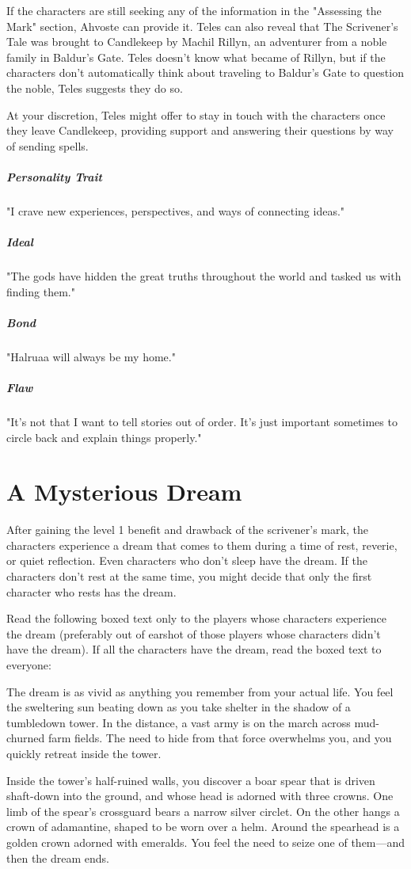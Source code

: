 \documentclass[10pt,a4paper,twoside,bg=print,twocolumn,openany,nodeprecatedcode]{dndbook}
\begin{document}
If the characters are still seeking any of the information in the "Assessing the Mark" section, Ahvoste can provide it. Teles can also reveal that The Scrivener's Tale was brought to Candlekeep by Machil Rillyn, an adventurer from a noble family in Baldur's Gate. Teles doesn't know what became of Rillyn, but if the characters don't automatically think about traveling to Baldur's Gate to question the noble, Teles suggests they do so.

At your discretion, Teles might offer to stay in touch with the characters once they leave Candlekeep, providing support and answering their questions by way of sending spells.

\subparagraph{Personality Trait}
"I crave new experiences, perspectives, and ways of connecting ideas."

\subparagraph{Ideal}
"The gods have hidden the great truths throughout the world and tasked us with finding them."

\subparagraph{Bond}
"Halruaa will always be my home."

\subparagraph{Flaw}
"It's not that I want to tell stories out of order. It's just important sometimes to circle back and explain things properly."

\section{A Mysterious Dream}
After gaining the level 1 benefit and drawback of the scrivener's mark, the characters experience a dream that comes to them during a time of rest, reverie, or quiet reflection. Even characters who don't sleep have the dream. If the characters don't rest at the same time, you might decide that only the first character who rests has the dream.

Read the following boxed text only to the players whose characters experience the dream (preferably out of earshot of those players whose characters didn't have the dream). If all the characters have the dream, read the boxed text to everyone:

\begin{DndReadAloud}{}
The dream is as vivid as anything you remember from your actual life. You feel the sweltering sun beating down as you take shelter in the shadow of a tumbledown tower. In the distance, a vast army is on the march across mud-churned farm fields. The need to hide from that force overwhelms you, and you quickly retreat inside the tower.

Inside the tower's half-ruined walls, you discover a boar spear that is driven shaft-down into the ground, and whose head is adorned with three crowns. One limb of the spear's crossguard bears a narrow silver circlet. On the other hangs a crown of adamantine, shaped to be worn over a helm. Around the spearhead is a golden crown adorned with emeralds. You feel the need to seize one of them—and then the dream ends.

\end{DndReadAloud}
\end{document}
